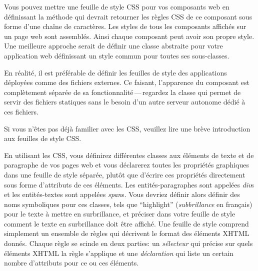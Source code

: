 \documentclass[a4paper,10pt,twoside]{book}
\begin{document}
Vous pouvez mettre une feuille de style CSS pour vos composants web en
définissant la méthode  qui devrait retourner les règles CSS
de ce composant sous forme d'une chaîne de caractères.
Les styles de tous les composants affichés sur un page web sont
assemblés. Ainsi chaque composant peut avoir son propre style.
Une meilleure approche serait de définir une classe abstraite pour
votre application web définissant un style commun pour toutes ses
sous-classes. %

En réalité, il est préférable de définir les feuilles de style des
applications déployées comme des fichiers externes.
Ce faisant, l'apparence du composant est complètement séparée de sa
fonctionnalité\,---\,regardez la classe  qui
permet de servir des fichiers statiques sans le besoin d'un autre
serveur autonome
dédié à ces fichiers.

Si vous n'êtes pas déjà familier avec les CSS, veuillez lire
une brève introduction aux feuilles de style CSS.

En utilisant les CSS, vous définirez différentes classes aux éléments
de texte et de paragraphe de vos pages web et vous déclarerez toutes
les propriétés graphiques dans une feuille de style séparée, plutôt
que d'écrire ces propriétés directement sous forme d'attributs de ces
éléments.
Les entités-paragraphes sont appelées \emph{div}s et les
entités-textes sont appelées \emph{span}s.
Vous devriez définir alors définir des noms symboliques pour ces
classes, tels que ``highlight'' (\emph{subbrillance} en français) pour
le texte à mettre en surbrillance, et préciser dans votre feuille de
style comment le texte en surbrillance doit être affiché.
Une feuille de style comprend simplement un ensemble de règles qui
décrivent le format des éléments XHTML donnés. 
Chaque règle se scinde en deux parties: un \emph{sélecteur} qui
précise sur quels éléments XHTML la règle s'applique et une
\emph{déclaration} qui liste un certain nombre d'attributs pour ce ou
ces éléments.
\end{document}

